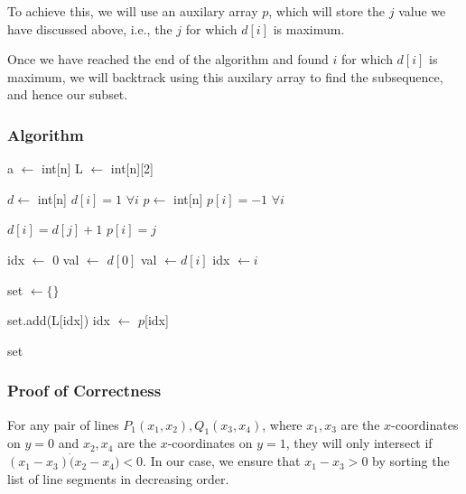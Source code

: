 \documentclass[12pt]{article}
\begin{document}
To achieve this, we will use an auxilary array $p$, which will store the $j$ value we have discussed above, i.e., the $j$ for which $d[i]$ is maximum.

Once we have reached the end of the algorithm and found $i$ for which $d[i]$ is maximum, we will backtrack using this auxilary array to find the subsequence, and hence our subset.

\subsubsection{Algorithm}

\begin{algorithm}
    \begin{algorithmic}[1]
        \Require a $\leftarrow$ int[n]
        \Require L $\leftarrow$ int[n][2] 


        \State $d \leftarrow$ int[n]
        \State $d[i] = 1$ $\forall i$
        \State $p \leftarrow$ int[n]
        \State $p[i] = -1$ $\forall i$

         
        \State $d[i] = d[j] + 1$
        \State $p[i] = j$
        \EndIf
        \EndFor
        \EndFor

        \State idx $\leftarrow$ 0
        \State val $\leftarrow$ $d[0]$
           
        \State val $\leftarrow d[i]$
        \State idx $\leftarrow i$
        \EndIf
        \EndFor

        \State set $\leftarrow \{\}$ 

        \State set.add(L[idx])
        \State idx $\leftarrow$ $p$[idx]

        \EndWhile

        \Return set
    \end{algorithmic}
\end{algorithm}


\subsubsection{Proof of Correctness}

For any pair of lines $P_1(x_1, x_2), Q_1(x_3, x_4)$, where $x_1, x_3$ are the $x$-coordinates on $y = 0$ and $x_2, x_4$ are the $x$-coordinates on $y = 1$, they will only intersect if $(x_1 - x_3) \dot (x_2 - x_4) < 0$. In our case, we ensure that $x_1 - x_3 > 0$ by sorting the list of line segments in decreasing order.
\end{document}
